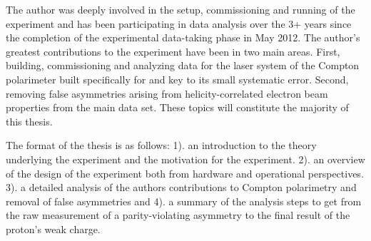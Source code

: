 The author was deeply involved in the setup, commissioning and running of the \Qs experiment and has been participating in data analysis over the 3+ years since the completion of the experimental data-taking phase in May 2012. The author's greatest contributions to the experiment have been in two main areas. First, building, commissioning and analyzing data for the laser system of the Compton polarimeter built specifically for \Qs and key to its small systematic error. Second, removing false asymmetries arising from helicity-correlated electron beam properties from the main data set. These topics will constitute the majority of this thesis.

The format of the thesis is as follows: 1). an introduction to the theory underlying the \Qs experiment and the motivation for the experiment. 2). an overview of the design of the experiment both from hardware and operational perspectives.
3). a detailed analysis of the authors contributions to Compton polarimetry and removal of false asymmetries and 4). a summary of the analysis steps to get from the raw measurement of a parity-violating asymmetry to the final result of the proton's weak charge. 
